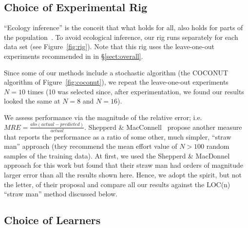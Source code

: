 \documentclass{sig-alternate}
\newcommand{\tion}[1]{\S\ref{sect:#1}}
\newcommand{\fig}[1]{Figure~\ref{fig:#1}}
\begin{document}
\subsection{Choice of Experimental Rig}


``Ecology inference''
is the conceit 
that what holds for all, also holds for parts 
of the population~\cite{posnet11,me12d}.
To avoid ecological inference,
our  rig runs separately for each data set (see Figure~\ref{fig:rig}).
Note that this rig uses the leave-one-out experiments recommended in
 in \tion{overall}.




Since some of our methods include a stochastic
algorithm (the COCONUT algorithm of \fig{coconut}),
we repeat the leave-one-out experiments $N=10$ times
(10 was selected since, after experimentation, we
found our results looked the same at $N=8$ and
$N=16$).

We assess  
performance via the magnitude of the relative error; i.e. 
\mbox{$ \mathit{MRE}=\frac{abs(\mathit{actual} - \mathit{predicted})}{\mathit{actual}}$}. 
Shepperd \& MacConnell~\cite{shepperd12a} propose
another measure that reports the performance as a
ratio of some other, much
simpler, ``straw man'' approach (they recommend the
mean effort value of $N>100$ random samples of the
training data). At first, we used the Shepperd \&
MacDonnel approach for this work but found that
their straw man had orders of magnitude larger error
than all the results shown here. Hence, we adopt the
spirit, but not the letter, of their proposal and
compare all our results against the LOC(n) ``straw
man'' method discussed below.



\subsection{Choice of Learners}\label{sect:whatlearn}
\end{document}
